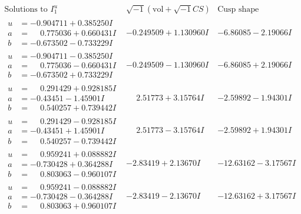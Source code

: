 \documentclass[1p]{elsarticle_modified}
\theoremstyle{definition}
\newcommand{\I}{\sqrt{-1}}
\begin{document}
$$\begin{array}{c|c|c}  
\text{Solutions to }I^u_{1}& \I (\text{vol} + \sqrt{-1}CS) & \text{Cusp shape}\\
 \hline 
\begin{aligned}
u &= -0.904711 + 0.385250 I \\
a &= \phantom{-}0.775036 + 0.660431 I \\
b &= -0.673502 - 0.733229 I\end{aligned}
 & -0.249509 + 1.130960 I & -6.86085 - 2.19066 I \\ \hline\begin{aligned}
u &= -0.904711 - 0.385250 I \\
a &= \phantom{-}0.775036 - 0.660431 I \\
b &= -0.673502 + 0.733229 I\end{aligned}
 & -0.249509 - 1.130960 I & -6.86085 + 2.19066 I \\ \hline\begin{aligned}
u &= \phantom{-}0.291429 + 0.928185 I \\
a &= -0.43451 - 1.45901 I \\
b &= \phantom{-}0.540257 + 0.739442 I\end{aligned}
 & \phantom{-}2.51773 + 3.15764 I & -2.59892 - 1.94301 I \\ \hline\begin{aligned}
u &= \phantom{-}0.291429 - 0.928185 I \\
a &= -0.43451 + 1.45901 I \\
b &= \phantom{-}0.540257 - 0.739442 I\end{aligned}
 & \phantom{-}2.51773 - 3.15764 I & -2.59892 + 1.94301 I \\ \hline\begin{aligned}
u &= \phantom{-}0.959241 + 0.088882 I \\
a &= -0.730428 + 0.364288 I \\
b &= \phantom{-}0.803063 - 0.960107 I\end{aligned}
 & -2.83419 + 2.13670 I & -12.63162 - 3.17567 I \\ \hline\begin{aligned}
u &= \phantom{-}0.959241 - 0.088882 I \\
a &= -0.730428 - 0.364288 I \\
b &= \phantom{-}0.803063 + 0.960107 I\end{aligned}
 & -2.83419 - 2.13670 I & -12.63162 + 3.17567 I \\ \hline\begin{aligned}

\end{aligned}
\end{array}$$
\end{document}
